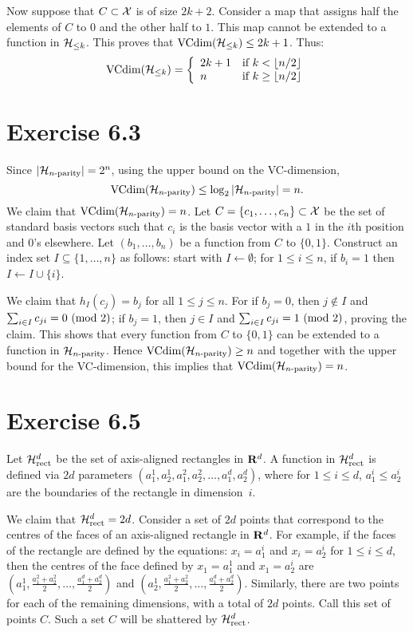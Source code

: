 Now suppose that $C \subset \mathcal{X}$ is of size $2k + 2$. Consider a map
that assigns half the elements of $C$ to $0$ and the other half to $1$.
This map cannot be extended to a function in $\mathcal{H}_{\leq k}$. This
proves that $\text{VCdim} (\mathcal{H}_{\leq k}) \leq 2k + 1$. Thus:
\[\text{VCdim}(\mathcal{H}_{\leq k})
= \left \{ \begin{array}{ll}
                2k + 1  & \text{if } k < \left \lfloor n / 2 \right \rfloor \\
                n       & \text{if } k \geq \left \lfloor n / 2 \right \rfloor
           \end{array} \right .
\]

\section*{Exercise 6.3}

Since $|\mathcal{H}_{n\text{-parity}}| = 2^n$, using the upper bound on the VC-dimension,
\[\text{VCdim} (\mathcal{H}_{n\text{-parity}}) \leq \log_2 |\mathcal{H}_{n\text{-parity}}| = n.\]
We claim that $\text{VCdim} (\mathcal{H}_{n\text{-parity}}) = n$. Let $C = \{c_1, \ldots, c_n\} \subset
\mathcal{X}$ be the set of standard basis vectors such that $c_i$ is the basis
vector with a $1$ in the $i$th position and $0$'s
elsewhere. Let $(b_1, \ldots, b_n)$ be a function from $C$ to $\{0, 1\}$.
Construct an index set $I \subseteq \{1, \ldots, n\}$ as follows:
start with $I \leftarrow \emptyset$; for $1 \leq i \leq n$, if $b_i = 1$
then $I \leftarrow I \cup \{i\}$.

We claim that $h_I(c_j) = b_j$ for all $1 \leq j \leq n$. For if $b_j = 0$,
then $j \notin I$ and $\sum_{i \in I} c_{j i} = 0 \ (\mathrm{mod}\ 2)$; if $b_j = 1$,
then $j \in I$ and $\sum_{i \in I} c_{j i} = 1 \ (\mathrm{mod}\ 2)$, proving the claim.
This shows that every function from $C$ to $\{0, 1\}$ can be extended to a function
in $\mathcal{H}_{n\text{-parity}}$. Hence $\text{VCdim} (\mathcal{H}_{n\text{-parity}}) \geq n$ and together with the upper
bound for the VC-dimension, this implies that $\text{VCdim} (\mathcal{H}_{n\text{-parity}}) = n$.

\section*{Exercise 6.5}

Let $\mathcal{H}_{\text{rect}}^{d}$ be the set of axis-aligned rectangles in $\mathbf{R}^{d}$. A function
in $\mathcal{H}_{\text{rect}}^{d}$ is defined via $2d$ parameters $(a_1^1, a_2^1, a_1^2, a_2^2,
\ldots, a_1^d, a_2^d)$, where for $1 \leq i \leq d$, $a_1^i \leq a_2^i$ are the
boundaries of the rectangle in dimension~$i$.

We claim that $\mathcal{H}_{\text{rect}}^{d} = 2d$. Consider a set of $2d$ points that correspond to
the centres of the faces of an axis-aligned rectangle in $\mathbf{R}^d$. For example,
if the faces of the rectangle are defined by the equations:
$x_i  = a_1^i$ and  $x_i = a_2^i$ for $1 \leq i \leq d$,
then the centres of the face defined by $x_1 = a_1^1$ and $x_1 = a_2^i$ are
$( a_1^1,  \frac{a_1^2 + a_2^2}{2},  \ldots, \frac{a_1^d + a_2^d}{2})$
and $( a_2^1,  \frac{a_1^2 + a_2^2}{2},  \ldots, \frac{a_1^d + a_2^d}{2})$.
Similarly, there are two points for each of the remaining dimensions, with a
total of $2d$ points. Call this set of points $C$. Such a set $C$ will be shattered
by $\mathcal{H}_{\text{rect}}^{d}$.

